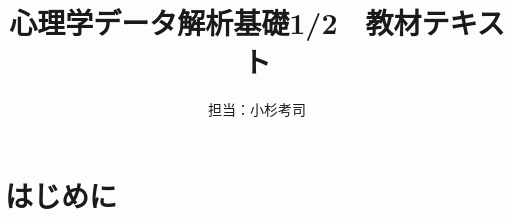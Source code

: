 \documentclass[uplatex]{jsarticle}
\begin{document}
\title{心理学データ解析基礎1/2　教材テキスト}
\author{担当：小杉考司}
\maketitle
\setcounter{tocdepth}{1}
\tableofcontents
\newpage
\section*{はじめに}


% 
% 
% 
% 
% 
% 
% 
% 
% 
% 
% 
% 
% 
% 
% 
% 
% 
% 
% 
% 
% 
% 
% 
% 
% 
% 
% 
% 
% 



\end{document}
